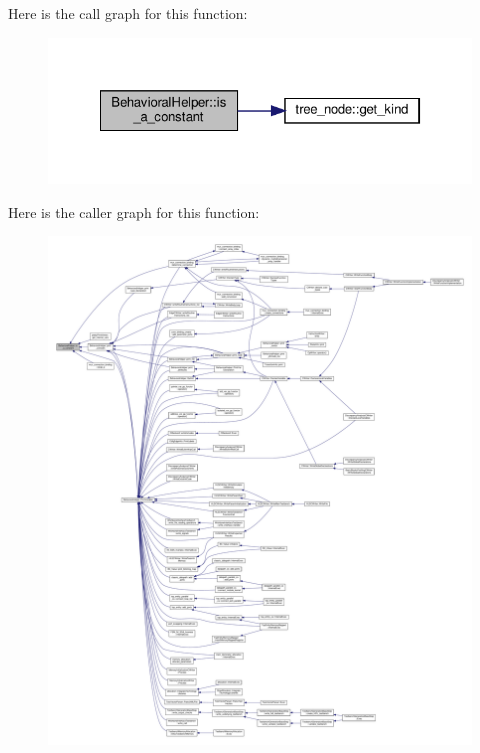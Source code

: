 Here is the call graph for this function\+:
\nopagebreak
\begin{figure}[H]
\begin{center}
\leavevmode
\includegraphics[width=322pt]{dd/db2/classBehavioralHelper_add58a0a0e9c70eb7c38fd9b65576ca90_cgraph}
\end{center}
\end{figure}
Here is the caller graph for this function\+:
\nopagebreak
\begin{figure}[H]
\begin{center}
\leavevmode
\includegraphics[width=350pt]{dd/db2/classBehavioralHelper_add58a0a0e9c70eb7c38fd9b65576ca90_icgraph}
\end{center}
\end{figure}
\mbox{\label{classBehavioralHelper_a4b2f7003179491ea4236e2cbb64fd2d9}} 
